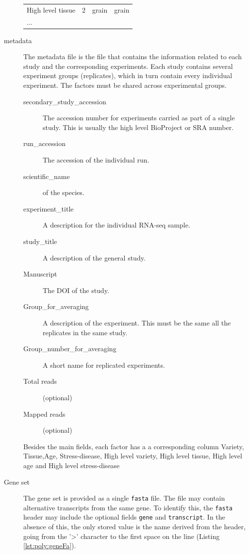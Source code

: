 \begin{description}
\begin{table}
\begin{tabular}{llll}
High level tissue & 2 & grain & grain \\
... & & \\
\bottomrule
\end{tabular}
\end{table}
\item[metadata] The metadata file is the file that contains the information related to each study and the corresponding experiments. 
Each study contains several experiment groups (replicates), which in turn contain every individual experiment. 
The factors must be shared across experimental groups. 
\begin{description}
\item[secondary\_study\_accession] The accession number for experiments carried as part of a single study. This is usually the high level BioProject or SRA number. 
\item[run\_accession] The accession of the individual run. 
\item[scientific\_name] of the species. 
\item[experiment\_title] A description for the individual RNA-seq sample.
\item[study\_title] A description of the general study.
\item[Manuscript] The DOI of the study.
\item[Group\_for\_averaging] A description of the experiment. This must be the same all the replicates in the same study. 
\item[Group\_number\_for\_averaging] A short name for replicated experiments.  
\item[Total reads] (optional)
\item[Mapped reads] (optional)
\end{description}
Besides the main fields, each factor has a a corresponding column Variety, Tissue,Age, Stress-disease, High level variety, High level tissue, High level age and High level stress-disease

\item[Gene set] The gene set is provided as a single \verb|fasta| file. 
The file may contain alternative transcripts from the same gene. To identify this, the \verb|fasta| header may include the optional fields \texttt{gene} and \texttt{transcript}. 
In the absence of this, the only stored value is the name derived from the header, going from the '\textgreater' character to the first space on the line (Listing \ref{lst:poly:geneFa}). 


\end{description}
